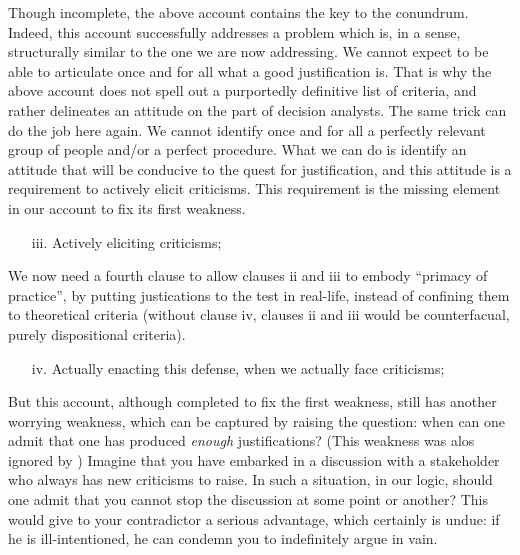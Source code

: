 \documentclass[preprint, french, english, 11pt, authoryear]{elsarticle}%
\begin{document}
Though incomplete, the above account contains the key to the conundrum. Indeed, this account successfully addresses a problem which is, in a sense, structurally similar to the one we are now addressing. We cannot expect to be able to articulate once and for all what a good justification is. That is why the above account does not spell out a purportedly definitive list of criteria, and rather delineates an attitude on the part of decision analysts. The same trick can do the job here again. We cannot identify once and for all a perfectly relevant group of people and/or a perfect procedure. What we can do is identify an attitude that will be conducive to the quest for justification, and this attitude is a requirement to actively elicit criticisms. This requirement is the missing element in our account to fix its first weakness.

\begin{itemize}
\item[iii.]	Actively eliciting criticisms;
\end{itemize}

We now need a fourth clause to allow clauses ii and iii to embody ``primacy of practice'', by putting justications to the test in real-life, instead of confining them to theoretical criteria (without clause iv, clauses ii and iii would be counterfacual, purely dispositional criteria).

\begin{itemize}
\item[iv.]	Actually enacting this defense, when we actually face criticisms;
\end{itemize}

But this account, although completed to fix the first weakness, still has another worrying weakness, which can be captured by raising the question: when can one admit that one has produced \emph{enough} justifications? (This weakness was alos ignored by  \cite{meinard_what_2017}) Imagine that you have embarked in a discussion with a stakeholder who always has new criticisms to raise. In such a situation, in our logic, should one admit that you cannot stop the discussion at some point or another? This would give to your contradictor a serious advantage, which certainly is undue: if he is ill-intentioned, he can condemn you to indefinitely argue in vain.
\end{document}
